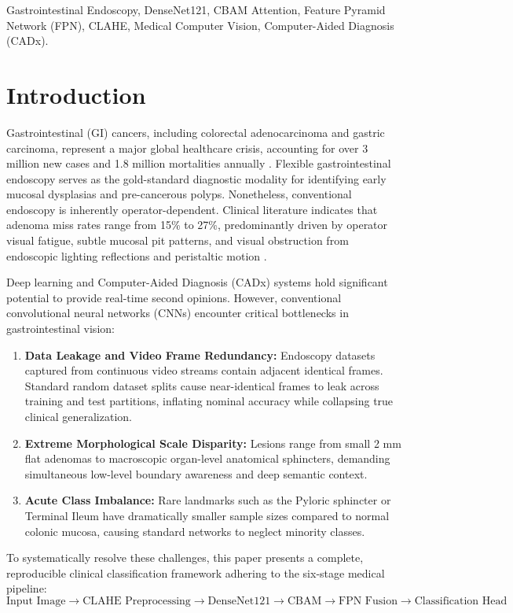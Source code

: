 \documentclass[conference]{IEEEtran}
\begin{document}
\begin{IEEEkeywords}
Gastrointestinal Endoscopy, DenseNet121, CBAM Attention, Feature Pyramid Network (FPN), CLAHE, Medical Computer Vision, Computer-Aided Diagnosis (CADx).
\end{IEEEkeywords}

\section{Introduction}
Gastrointestinal (GI) cancers, including colorectal adenocarcinoma and gastric carcinoma, represent a major global healthcare crisis, accounting for over 3 million new cases and 1.8 million mortalities annually \cite{b1}. Flexible gastrointestinal endoscopy serves as the gold-standard diagnostic modality for identifying early mucosal dysplasias and pre-cancerous polyps. Nonetheless, conventional endoscopy is inherently operator-dependent. Clinical literature indicates that adenoma miss rates range from 15\% to 27\%, predominantly driven by operator visual fatigue, subtle mucosal pit patterns, and visual obstruction from endoscopic lighting reflections and peristaltic motion \cite{b2}.

Deep learning and Computer-Aided Diagnosis (CADx) systems hold significant potential to provide real-time second opinions. However, conventional convolutional neural networks (CNNs) encounter critical bottlenecks in gastrointestinal vision:
\begin{enumerate}
    \item \textbf{Data Leakage and Video Frame Redundancy:} Endoscopy datasets captured from continuous video streams contain adjacent identical frames. Standard random dataset splits cause near-identical frames to leak across training and test partitions, inflating nominal accuracy while collapsing true clinical generalization.
    \item \textbf{Extreme Morphological Scale Disparity:} Lesions range from small 2 mm flat adenomas to macroscopic organ-level anatomical sphincters, demanding simultaneous low-level boundary awareness and deep semantic context.
    \item \textbf{Acute Class Imbalance:} Rare landmarks such as the Pyloric sphincter or Terminal Ileum have dramatically smaller sample sizes compared to normal colonic mucosa, causing standard networks to neglect minority classes.
\end{enumerate}

To systematically resolve these challenges, this paper presents a complete, reproducible clinical classification framework adhering to the six-stage medical pipeline:
$$\text{Input Image} \rightarrow \text{CLAHE Preprocessing} \rightarrow \text{DenseNet121} \rightarrow \text{CBAM} \rightarrow \text{FPN Fusion} \rightarrow \text{Classification Head}$$
\end{document}
